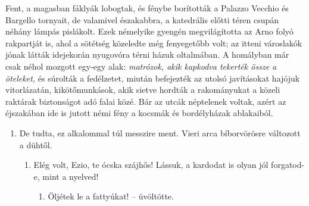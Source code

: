 \documentclass[12pt,a4paper]{article}
\begin{document}
Fent, a magasban fáklyák lobogtak, és fénybe borították a Palazzo Vecchio és Bargello tornyait, de valamivel északabbra, a katedrális előtti téren csupán néhány lámpás pislákolt. Ezek némelyike gyengén megvilágította az Arno folyó rakpartját is, ahol a sötétség közeledte még fenyegetőbb volt; az itteni városlakók jónak látták idejekorán nyugovóra  térni  házuk  oltalmában. A homályban  már  csak  néhol mozgott  egy-egy  alak:  \emph{matrózok,  akik  kapkodva  tekerték  össze  a öteleket,}  és  súrolták  a  fedélzetet,  miután  befejezték  az  utolsó javításokat hajójuk vitorlázatán, kikötőmunkások, akik sietve hordták a rakományukat a közeli raktárak biztonságot adó falai közé. Bár az utcák néptelenek voltak, azért az éjszakában ide is jutott némi fény a kocsmák és bordélyházak ablakaiból.

\begin{enumerate}
    \item De  tudta, ez alkalommal túl messzire  ment. Vieri arca bíborvörösre változott a dühtől. 
    \begin{enumerate}
        \item Elég volt, Ezio, te ócska szájhős! Lássuk, a kardodat is olyan jól 
        forgatod-e, mint a nyelved!
        \begin{enumerate}
            \item Öljétek le a fattyúkat! – üvöltötte.
        \end{enumerate}
    \end{enumerate}
\end{enumerate}
\end{document}
